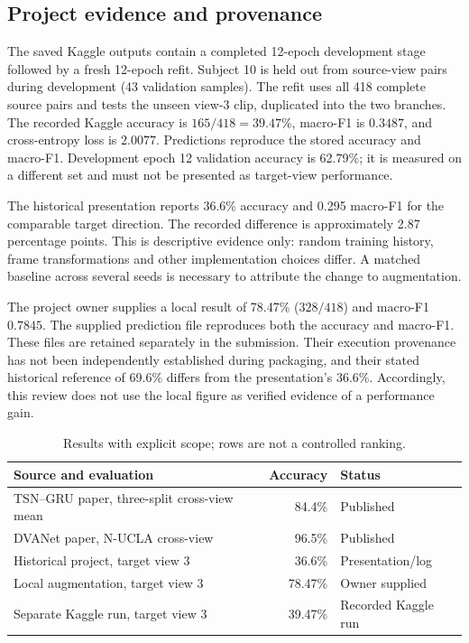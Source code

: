 \documentclass[runningheads]{llncs}
\begin{document}
\subsection{Project evidence and provenance}
The saved Kaggle outputs contain a completed 12-epoch development stage followed by a fresh 12-epoch refit. Subject 10 is held out from source-view pairs during development (43 validation samples). The refit uses all 418 complete source pairs and tests the unseen view-3 clip, duplicated into the two branches. The recorded Kaggle accuracy is $165/418=39.47\%$, macro-F1 is $0.3487$, and cross-entropy loss is $2.0077$. Predictions reproduce the stored accuracy and macro-F1. Development epoch 12 validation accuracy is 62.79\%; it is measured on a different set and must not be presented as target-view performance.

The historical presentation reports 36.6\% accuracy and 0.295 macro-F1 for the comparable target direction. The recorded difference is approximately 2.87 percentage points. This is descriptive evidence only: random training history, frame transformations and other implementation choices differ. A matched baseline across several seeds is necessary to attribute the change to augmentation.

The project owner supplies a local result of 78.47\% ($328/418$) and macro-F1 $0.7845$. The supplied prediction file reproduces both the accuracy and macro-F1. These files are retained separately in the submission. Their execution provenance has not been independently established during packaging, and their stated historical reference of 69.6\% differs from the presentation's 36.6\%. Accordingly, this review does not use the local figure as verified evidence of a performance gain.

\begin{table}[t]
\caption{Results with explicit scope; rows are not a controlled ranking.}
\centering\small
\begin{tabular}{p{5.9cm}r p{2.7cm}}
\hline
Source and evaluation & Accuracy & Status\\\hline
TSN--GRU paper, three-split cross-view mean & 84.4\% & Published\\
DVANet paper, N-UCLA cross-view & 96.5\% & Published\\
Historical project, target view 3 & 36.6\% & Presentation/log\\
Local augmentation, target view 3 & 78.47\% & Owner supplied\\
Separate Kaggle run, target view 3 & 39.47\% & Recorded Kaggle run\\\hline
\end{tabular}
\end{table}
\end{document}
